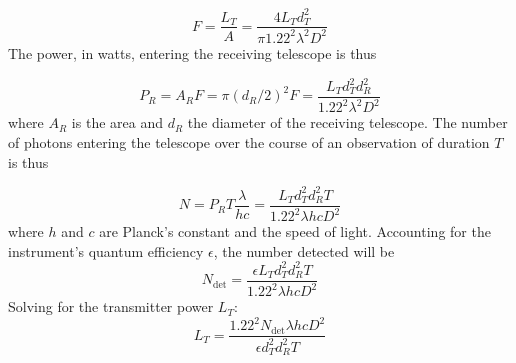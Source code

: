 \documentclass[twocolumn]{aastex701}
\begin{document}
\begin{equation}
    F = \frac{L_T}{A} = \frac{4 L_T d_T^2}{\pi 1.22^2 \lambda^2 D^2}
\end{equation}
The power, in watts, entering the receiving telescope is thus

\begin{equation}
    P_R = A_R F = \pi (d_R/2)^2 F = \frac{L_T d_T^2 d_R^2}{1.22^2 \lambda^2 D^2}
\end{equation}
where $A_R$ is the area and $d_R$ the diameter of the receiving telescope.  The number of photons entering the telescope over the course of an observation of duration $T$ is thus

\begin{equation}
    N = P_R T \frac{\lambda}{h c} = \frac{L_T d_T^2 d_R^2 T}{1.22^2 \lambda h c D^2}
\end{equation}
where $h$ and $c$ are Planck's constant and the speed of light.  Accounting for the instrument's quantum efficiency $\epsilon$, the number detected will be
\begin{equation}
    N_{\mbox{det}} = \frac{\epsilon L_T d_T^2 d_R^2 T}{1.22^2 \lambda h c D^2}
\end{equation}
Solving for the transmitter power $L_T$:
\begin{equation}
    L_T = \frac{1.22^2 N_{\mbox{det}} \lambda h c D^2}{\epsilon d_T^2 d_R^2 T}
\end{equation}


\end{document}
